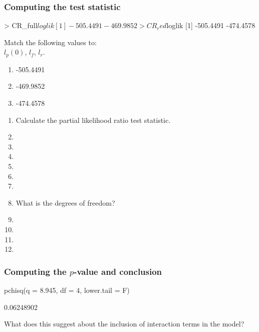 \begin{frame}[fragile]
\frametitle{Computing the test statistic}
\begin{minipage}{0.5\textwidth}
\begin{Rout}{0.0}
> CR_full$loglik
[1] -505.4491 -469.9852

> CR_red$loglik
[1] -505.4491 -474.4578
\end{Rout}
\begin{clicker}{Match the following values to:\\ $l_p(0)$, $l_f$, $l_r$.}
\begin{enumerate}
\item -505.4491
\item -469.9852
\item -474.4578
\end{enumerate}
\end{clicker}
\end{minipage}
\blankcolumn
\begin{minipage}{0.4\textwidth}
\begin{enumerate}
\item Calculate the partial likelihood ratio test statistic.
\item[]
\item[]
\item[]
\item[]
\item[]
\item[]
\item What is the degrees of freedom?
\item[]
\item[]
\item[]
\item[]
\end{enumerate}
\end{minipage}
\end{frame}

\begin{frame}[fragile]
\frametitle{Computing the $p$-value and conclusion}
\begin{Rcode}{.25}
pchisq(q = 8.945, df = 4, lower.tail = F)
\end{Rcode}
\begin{Rout}{.25}
0.06248902
\end{Rout}
What does this suggest about the inclusion of interaction terms in the model?
\vskip200pt
\end{frame}


